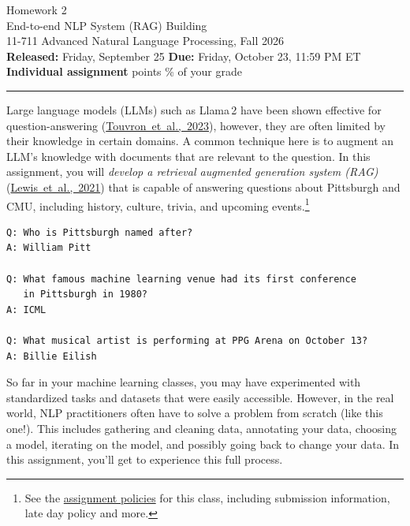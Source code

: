 \documentclass[11pt]{article}
\begin{document}
\begin{center}
  {\Huge\sffamily\color{mauve} Homework 2}\\[6pt]
  {\Large\sffamily End-to-end NLP System (RAG) Building}\\[10pt]
  {\large 11-711 Advanced Natural Language Processing, Fall 2026}\\[4pt]
  \textbf{Released:} Friday, September 25 \quad\textbf{Due:} Friday, October 23, 11:59 PM ET\\[2pt]
  \textbf{Individual assignment}  points \% of your grade
\end{center}

\vspace{0.8em}
\hrule
\vspace{0.8em}

\noindent Large language models (LLMs) such as Llama\,2 have been shown effective for
question-answering \mbox{(\href{https://arxiv.org/abs/2307.09288}{Touvron et al., 2023})}, however,
they are often limited by their knowledge in certain domains. A common technique here is to augment
an LLM's knowledge with documents that are relevant to the question. In this assignment, you will
\emph{develop a retrieval augmented generation system (RAG)}
\mbox{(\href{https://arxiv.org/abs/2005.11401}{Lewis et al., 2021})} that is capable of answering
questions about Pittsburgh and CMU, including history, culture, trivia, and upcoming
events.\footnote{See the \href{https://cmu-anlp.org/assignments/}{assignment policies} for this
class, including submission information, late day policy and more.}

\begin{codebox}
\begin{verbatim}
Q: Who is Pittsburgh named after?
A: William Pitt

Q: What famous machine learning venue had its first conference
   in Pittsburgh in 1980?
A: ICML

Q: What musical artist is performing at PPG Arena on October 13?
A: Billie Eilish
\end{verbatim}
\end{codebox}

\noindent So far in your machine learning classes, you may have experimented with standardized tasks
and datasets that were easily accessible. However, in the real world, NLP practitioners often have to
solve a problem from scratch (like this one!). This includes gathering and cleaning data, annotating
your data, choosing a model, iterating on the model, and possibly going back to change your data. In
this assignment, you'll get to experience this full process.
\end{document}

